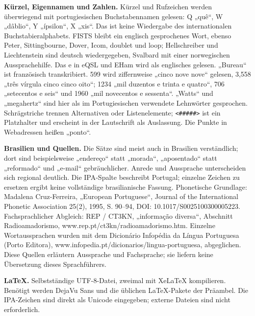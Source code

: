 \documentclass[a4paper,landscape,10pt]{article}
\newcommand{\ipa}[1]{{\ipafont[#1]}}
\begin{document}
\medskip
\textbf{Kürzel, Eigennamen und Zahlen.} Kürzel und Rufzeichen werden überwiegend mit portugiesischen
Buchstabennamen gelesen: Q „quê“, W „dâblio“, Y „ípsilon“, X „xis“.
Das ist keine Wiedergabe des internationalen Buchstabieralphabets.
FISTS bleibt ein englisch gesprochenes Wort, ebenso Peter, Sittingbourne, Dover, Icom, doublet und loop;
Hellschreiber und Liechtenstein sind deutsch wiedergegeben, Svalbard mit einer norwegischen Aussprachehilfe.
Das e in eQSL und EHam wird als englisches \ipa{i} gelesen. „Bureau“ ist französisch transkribiert.
599 wird ziffernweise „cinco nove nove“ gelesen, 3,558 „três vírgula cinco cinco oito“;
1234 „mil duzentos e trinta e quatro“, 706 „setecentos e seis“ und 1960 „mil novecentos e sessenta“.
„Watts“ und „megahertz“ sind hier als im Portugiesischen verwendete Lehnwörter gesprochen.
Schrägstriche trennen Alternativen oder Listenelemente; \texttt{<\#\#\#\#\#>} ist ein Platzhalter
und erscheint in der Lautschrift als Auslassung. Die Punkte in Webadressen heißen „ponto“.

\medskip
\textbf{Brasilien und Quellen.} Die Sätze sind meist auch in Brasilien verständlich; dort sind beispielsweise
„endereço“ statt „morada“, „aposentado“ statt „reformado“ und „e-mail“ gebräuchlicher.
Anrede und Aussprache unterscheiden sich regional deutlich. Die IPA-Spalte beschreibt Portugal;
einzelne Zeichen zu ersetzen ergibt keine vollständige brasilianische Fassung.
Phonetische Grundlage: Madalena Cruz-Ferreira, „European Portuguese“,
Journal of the International Phonetic Association 25(2), 1995, S. 90--94,
DOI: 10.1017/S0025100300005223. Fachsprachlicher Abgleich: REP / CT3KN,
„informação diversa“, Abschnitt Radioamadorismo, www.rep.pt/ct3kn/radioamadorismo.htm.
Einzelne Wortaussprachen wurden mit dem Dicionário Infopédia da Língua Portuguesa (Porto Editora),
www.infopedia.pt/dicionarios/lingua-portuguesa, abgeglichen.
Diese Quellen erläutern Aussprache und Fachsprache; sie liefern keine Übersetzung dieses Sprachführers.

\medskip
\textbf{LaTeX.} Selbstständige UTF-8-Datei, zweimal mit XeLaTeX kompilieren.
Benötigt werden DejaVu Sans und die üblichen LaTeX-Pakete der Präambel.
Die IPA-Zeichen sind direkt als Unicode eingegeben; externe Dateien sind nicht erforderlich.
\end{document}
